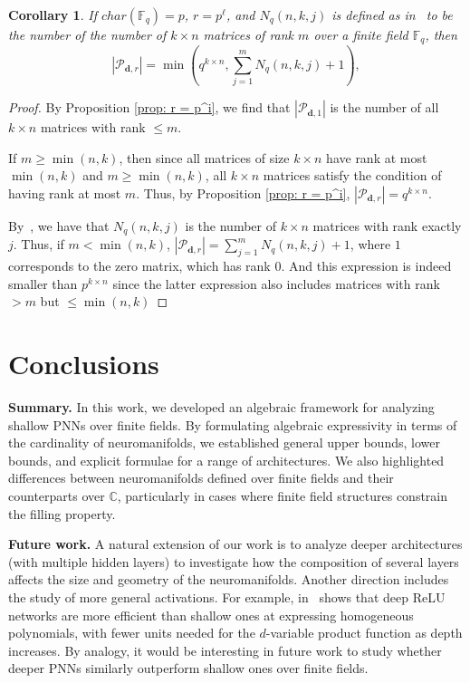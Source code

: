 \documentclass[a4paper]{cas-sc}
\newcommand{\dd}{\mathbf{d}}    %
\newcommand{\F}{\mathbb{F}}
\newtheorem{corollary}{Corollary}[theorem]
\begin{document}
\begin{corollary} 
\label{cor: char(F) = p, m >= n or k}
    If $char(\F_q)=p$, $r = p^\ell$, and $N_q(n,k,j)$ is defined as in~ to be the number of  the number of $k\times n$ matrices of rank $m$ over a finite field $\F_q$, then $$|\mathcal{P}_{\dd,r}| = \min\left(q^{k \times n}, \sum_{j = 1}^m N_q(n,k,j) + 1\right),$$
\end{corollary} 
\begin{proof}
    By Proposition \ref{prop: r = p^i}, we find that $|\mathcal{P}_{\dd,1}|$ is the number of all $k \times n$ matrices with rank $\leq m$.
    
    If $m \geq \min(n,k)$, then since all matrices of size $k \times n$ have rank at most $\min(n,k)$ and $m \geq \min(n,k)$, all $k \times n$ matrices satisfy the condition of having rank at most $m$. Thus, by Proposition \ref{prop: r = p^i}, $|\mathcal{P}_{\dd,r}| = q^{k \times n}$.
    
    By~, we have that $N_q(n,k,j)$ is the number of $k \times n$ matrices with rank exactly $j$. Thus, if $m < \min(n,k)$, $|\mathcal{P}_{\dd,r}| =  \sum_{j=1}^m N_{q}(n,k,j) + 1$, where $1$ corresponds to the zero matrix, which has rank $0$. And this expression is indeed smaller than $p^{k \times n}$ since the latter expression also includes matrices with rank $ > m $ but $ \leq \min(n,k)$
\end{proof}

\section{Conclusions} 
\label{sec:conclusion}

    \textbf{Summary.} In this work, we developed an algebraic framework for analyzing shallow PNNs over finite fields. By formulating algebraic expressivity in terms of the cardinality of neuromanifolds, we established general upper bounds, lower bounds, and explicit formulae for a range of architectures. We also highlighted differences between neuromanifolds defined over finite fields and their counterparts over $\mathbb{C}$, particularly in cases where finite field structures constrain the filling property.

    \textbf{Future work.} A natural extension of our work is to analyze deeper architectures (with multiple hidden layers) to investigate how the composition of several layers affects the size and geometry of the neuromanifolds. Another direction includes the study of more general activations. For example, in~\citet{SHAPIRA2023} shows that deep ReLU networks are more efficient than shallow ones at expressing homogeneous polynomials, with fewer units needed for the $d$-variable product function as depth increases. By analogy, it would be interesting in future work to study whether deeper PNNs similarly outperform shallow ones over finite fields.
\end{document}
